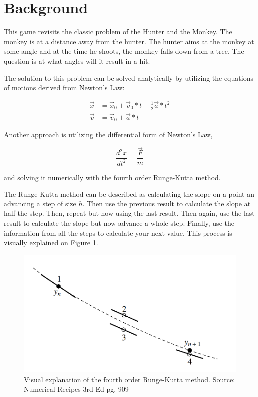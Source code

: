 
\section*{Background}

This game revisits the classic problem of the Hunter and the Monkey. The monkey is at a distance away from the hunter. The hunter aims at the monkey at some angle and at the time he shoots, the monkey falls down from a tree. The question is at what angles will it result in a hit.

The solution to this problem can be solved analytically by utilizing the equations of motions derived from Newton's Law:

\begin{align}
    \vec{x} &= \vec{x}_0 + \Vec{v}_0*t + \frac{1}{2} \vec{a}*t^2 \\
    \vec{v} &= \vec{v}_0 + \vec{a}*t
\end{align}

Another approach is utilizing the differential form of Newton's Law, 

\begin{equation}
    \frac{d^2 x}{dt^2} = \frac{\vec{F}}{m}
\end{equation}

and solving it numerically with the fourth order Runge-Kutta method. 

The Runge-Kutta method can be described as calculating the slope on a point an advancing a step of size $h$. Then use the previous result to calculate the slope at half the step. Then, repeat but now using the last result. Then again, use the last result to calculate the slope but now advance a whole step. Finally, use the information from all the steps to calculate your next value. This process is visually explained on Figure \ref{fig:rk4Example}.

\begin{figure}
    \centering
    \includegraphics[width=\linewidth]{figures/rk4Example.png}
    \caption{Visual explanation of the fourth order Runge-Kutta method. \small{Source: Numerical Recipes 3rd Ed pg. 909}}
    \label{fig:rk4Example}
\end{figure}

